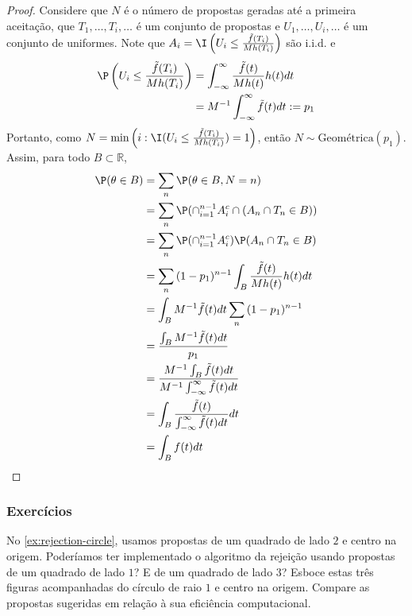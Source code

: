 \begin{proof}
 Considere que $N$ é o número de propostas geradas
 até a primeira aceitação, que
 $T_{1},\ldots,T_{i},\ldots$ é um conjunto de propostas e
 $U_{1},\ldots,U_{i},\ldots$ é um conjunto de uniformes.
 Note que $A_{i} = \I\left(U_{i} \leq \frac{\tilde{f}(T_{i})}{Mh(T_{i})}\right)$ são i.i.d. e
 \begin{align*}
  \P\left(U_{i} \leq
  \frac{\tilde{f}(T_{i})}
  {Mh(T_{i})}\right)
  &= \int_{-\infty}^{\infty}
  {\frac{\tilde{f}(t)}{Mh(t)} h(t) dt} \\
  &= M^{-1}\int_{-\infty}^{\infty}
  {\tilde{f}(t)dt} := p_{1}
 \end{align*}
 Portanto, como $N = \min\left(i: \I(U_{i} \leq \frac{\tilde{f}(T_{i})}{Mh(T_{i})}) =1\right)$,
 então $N \sim \text{Geométrica}(p_{1})$. Assim, para todo 
 $B \subset \mathbb{R}$,
 \begin{align*}
  \P(\theta \in B)
  &= \sum_{n}{\P(\theta \in B, N = n)} \\
  &= \sum_{n}{\P(\cap_{i=1}^{n-1}{A_{i}^{c}} \cap (A_{n} \cap T_{n} \in B))} \\
  &= \sum_{n}{\P(\cap_{i=1}^{n-1}{A_{i}^{c}})\P(A_{n} \cap T_{n} \in B)} \\
  &= \sum_{n}{(1-p_{1})^{n-1}\int_{B}{\frac{\tilde{f}(t)}{Mh(t)} h(t)dt}} \\
  &= \int_{B}{M^{-1}\tilde{f}(t)dt}\sum_{n}{(1-p_{1})^{n-1}} \\
  &= \frac{\int_{B}{M^{-1}\tilde{f}(t)dt}}{p_{1}} \\
  &= \frac{M^{-1}\int_{B}{\tilde{f}(t)dt}}{M^{-1}\int_{-\infty}^{\infty}{\tilde{f}(t)dt}} \\
  &= \int_{B}{\frac{\tilde{f}(t)}{\int_{-\infty}^{\infty}{\tilde{f}(t)dt}}dt} \\
  &= \int_{B}{f(t)dt}
 \end{align*} 
\end{proof}

\subsubsection*{Exercícios}

\begin{exercise}
 No \cref{ex:rejection-circle},
 usamos propostas de um quadrado de lado $2$
 e centro na origem.
 Poderíamos ter implementado o algoritmo da rejeição
 usando propostas de um quadrado de lado $1$?
 E de um quadrado de lado $3$?
 Esboce estas três figuras acompanhadas
 do círculo de raio $1$ e centro na origem.
 Compare as propostas sugeridas em relação à sua eficiência computacional.
\end{exercise}

